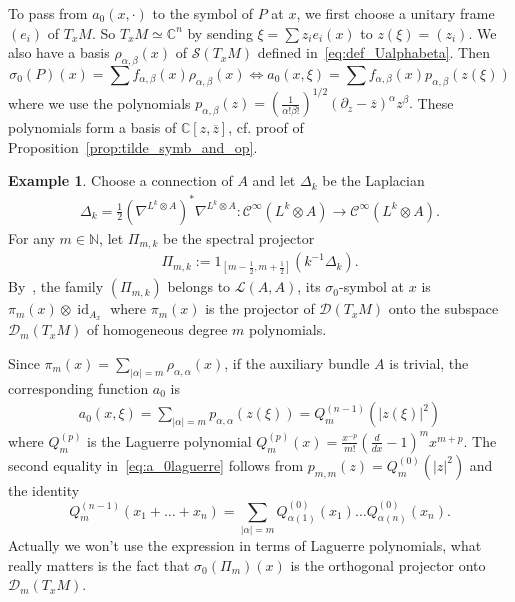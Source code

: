 \documentclass[10pt,a4paper]{article}
\theoremstyle{definition}
\newtheorem{exam}[theo]{Example}
\numberwithin{equation}{section}
\newcommand{\N}{{\mathbb{N}}}
\newcommand{\C}{{\mathbb{C}}}
\newcommand{\be}{{\beta}}
\newcommand{\al}{{\alpha}}
\newcommand{\si}{{\sigma}}
\newcommand{\con}{\overline}
\newcommand{\op}{\operatorname}
\newcommand{\Ci}{{\mathcal{C}}^{\infty}}
\newcommand{\D}{\mathcal{D}}
\newcommand{\symb}{\mathcal{S}}
\newcommand{\lag}{\mathcal{L}}
\newcommand{\Uu}{\rho}
\newcommand{\Ppp}{p}
\begin{document}
To pass from $a_0(x,\cdot)$ to the symbol of $P$ at $x$, we first choose a unitary frame $(e_i)$ of $T_xM$. So $T_xM \simeq \C^n$ by sending $\xi = \sum z_i e_i(x) $ to $z(\xi)= (z_i)$. We also have a basis $\Uu_{\al, \be}(x)$ of $\symb (T_xM) $ defined in~\eqref{eq:def_Ualphabeta}. Then
\[
\si_0(P) (x) = \sum f_{\al, \be} (x) \Uu_{\al,\be} (x) \Leftrightarrow
a_0 (x,\xi) = \sum f_{\al, \be} (x) \Ppp_{\al, \be} (z(\xi))
\]
where we use the polynomials $ \Ppp_{\al, \be} (z) = (\frac{1}{\al! \be !}) ^{1/2} (
\partial_z - \con{z})^{\al} z^\be.$ These polynomials form a basis of $\C [z,
\con{z}]$, cf. proof of Proposition~\ref{prop:tilde_symb_and_op}.

\begin{exam}\label{exemple:projecteur}
Choose a connection of $A$ and let $\Delta_k$ be the Laplacian
\begin{gather}\label{eq:laplacien_fibre_auxiliaire}
\Delta_k = \tfrac{1}{2} \left(\nabla^{L^k
\otimes A}\right)^* \nabla^{L^k \otimes A} : \Ci\left(L^k \otimes A\right) \rightarrow \Ci \left(L^k \otimes A\right).
\end{gather}
For any $m \in \N$, let $\Pi_{m,k}$ be the spectral projector
\begin{gather}\label{eq:projecteur_fibre_auxiliaire}
\Pi_{m,k} := 1_{\left[m - \frac{1}{2}, m +
\frac{1}{2}\right]} \left(k^{-1} \Delta_k\right).
\end{gather}
By~\cite{oim_copain}, the family $(\Pi_{m,k})$ belongs to $\lag(A,A)$, its $\si_0$-symbol at $x$ is $\pi_m(x) \otimes \op{id}_{A_x}$ where $\pi_m(x)$ is the projector of $\D (T_xM)$ onto the subspace $\D_m(T_xM)$ of homogeneous degree $m$ polynomials.

Since $\pi_m (x) = \sum_{|\al|=m} \rho_{\al, \al}(x)$, if the auxiliary bundle $A$ is trivial, the corresponding function $a_0$ is
\begin{gather}\label{eq:a_0laguerre}
a_0(x, \xi) = \sum_{|\al| =m} p_{\al,\al}(z(\xi)) = Q_m^{(n-1)} \left(|z(\xi)|^2\right)
\end{gather}
where $Q_m^{(p)} $ is the Laguerre polynomial $Q^{(p)}_m (x) = \frac{x^{-p}}{m!}(\frac{d}{dx} -1) ^m x ^{m+p}$. The second equality in~\eqref{eq:a_0laguerre} follows from $p_{m,m} (z) = Q_m^{(0)} (|z|^2)$ and the identity
\[
Q_m^{(n-1)} (x_1+ \ldots + x_n) =
\sum_{|\al| = m } Q_{\al(1)}^{(0)} (x_1) \ldots Q_{\al(n)}^{(0)} (x_n).
\]
Actually we won't use the expression in terms of Laguerre polynomials, what really matters is the fact that $\si_0 (\Pi_m) (x)$ is the orthogonal projector onto $\D _m(T_xM)$.
\end{exam}
\end{document}
